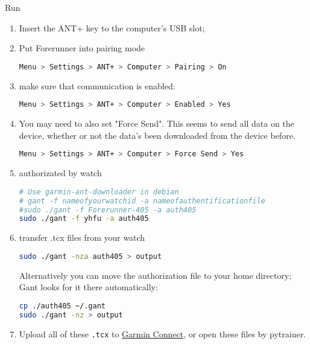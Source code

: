 \documentclass[letter,12pt,onecolumn]{article}
\newcommand{\cnt}[3]{{#1}{#2}{#3}}
\renewcommand{\cnt}[3]{#2}
\renewcommand{\cnt}[3]{#3}
\renewcommand{\cnt}[3]{#1}
\begin{document}
\cnt{Run}{使用}{運行}
\begin{enumerate}
  \item \cnt{Insert the ANT+ key to the computer's USB slot;}{插入 ANT+ key 到计算机 USB 接口上；}{插入 ANT+ key 到電腦 USB 接口上；}

  \item \cnt{Put Forerunner into pairing mode}{在表的菜单下设置 ANT+ 的对接：}{在表的菜單下設置 ANT+ 的對接：}
\begin{lstlisting}[language=bash]
Menu > Settings > ANT+ > Computer > Pairing > On
\end{lstlisting}

  \item \cnt{make sure that communication is enabled:}{确保打开了通讯：}{確保打開了通訊：}
\begin{lstlisting}[language=bash]
Menu > Settings > ANT+ > Computer > Enabled > Yes
\end{lstlisting}

  \item \cnt{You may need to also set "Force Send". This seems to send all data on the device, whether or not the data's been downloaded from the device before.}{如果需要的话，打开强制发送所有已发和未发数据：}{如果需要的話，打開強制發送所有已發和未發數據：}
\begin{lstlisting}[language=bash]
Menu > Settings > ANT+ > Computer > Force Send > Yes
\end{lstlisting}

  \item \cnt{authorizated by watch}{表认证：}{錶認證：}
\begin{lstlisting}[language=bash]
# Use garmin-ant-downloader in debian
# gant -f nameofyourwatchid -a nameofauthentificationfile
#sudo ./gant -f Forerunner-405 -a auth405
sudo ./gant -f yhfu -a auth405
\end{lstlisting}

  \item \cnt{transfer .tcx files from your watch}{从表中获取 .tcx 文件}{從錶中獲取 .tcx 文件}
\begin{lstlisting}[language=bash]
sudo ./gant -nza auth405 > output
\end{lstlisting}

\cnt{Alternatively you can move the authorization file to your home directory; Gant looks for it there automatically:}
    {可以将文件 auth405 复制到 HOME 目录而不用再次指定：}
    {可以將文件 auth405 複制到 HOME 目錄而不用再次指定：}
\begin{lstlisting}[language=bash]
cp ./auth405 ~/.gant
sudo ./gant -nz > output
\end{lstlisting}

  \item \cnt{Upload all of these \texttt{.tcx} to \href{http://connect.garmin.com/}{Garmin Connect}, or open these files by pytrainer.}
            {上传这些 .tcx 文件到 \href{http://connect.garmin.com/}{Garmin Connect} 网站上；或使用 pytrainer。}
            {上傳這些 .tcx 文件到 \href{http://connect.garmin.com/}{Garmin Connect} 網站上；或使用 pytrainer。}
\end{enumerate}
\end{document}
